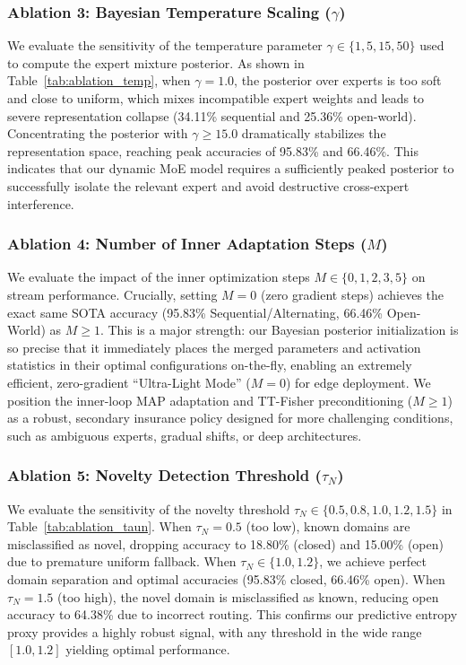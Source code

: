 \documentclass{article}
\theoremstyle{plain}
\theoremstyle{definition}
\theoremstyle{remark}
\begin{document}
\subsubsection{Ablation 3: Bayesian Temperature Scaling ($\gamma$)}\vspace{-0.1in}
We evaluate the sensitivity of the temperature parameter $\gamma \in \{1, 5, 15, 50\}$ used to
compute the expert mixture posterior.
As shown in Table~\ref{tab:ablation_temp}, when $\gamma=1.0$, the posterior over experts is too
soft and close to uniform, which mixes incompatible expert weights and leads to severe
representation collapse (34.11\% sequential and 25.36\% open-world). Concentrating the posterior
with $\gamma \ge 15.0$ dramatically stabilizes the representation space, reaching peak accuracies of
95.83\% and 66.46\%. This indicates that our dynamic MoE model requires a
sufficiently peaked posterior to successfully isolate the relevant expert and avoid destructive
cross-expert interference.

\subsubsection{Ablation 4: Number of Inner Adaptation Steps ($M$)}\vspace{-0.1in}
We evaluate the impact of the inner optimization steps $M \in \{0, 1, 2, 3, 5\}$ on stream
performance. Crucially, setting $M=0$ (zero gradient steps) achieves the exact same SOTA accuracy
(95.83\% Sequential/Alternating, 66.46\% Open-World) as $M \ge 1$. This is a major strength: our Bayesian posterior initialization is so precise that it immediately places the merged parameters and activation statistics in their optimal configurations on-the-fly, enabling an extremely efficient, zero-gradient ``Ultra-Light Mode'' ($M=0$) for edge deployment. We position the inner-loop MAP adaptation and TT-Fisher preconditioning ($M \ge 1$) as a robust, secondary insurance policy designed for more challenging conditions, such as ambiguous experts, gradual shifts, or deep architectures.

\subsubsection{Ablation 5: Novelty Detection Threshold ($\tau_N$)}\vspace{-0.1in}
We evaluate the sensitivity of the novelty threshold $\tau_N \in \{0.5, 0.8, 1.0, 1.2, 1.5\}$ in
Table~\ref{tab:ablation_taun}. When $\tau_N=0.5$ (too low), known domains are misclassified as
novel, dropping accuracy to 18.80\% (closed) and 15.00\% (open) due to premature uniform fallback. When $\tau_N \in \{1.0, 1.2\}$, we achieve perfect domain separation and optimal accuracies
(95.83\% closed, 66.46\% open). When $\tau_N=1.5$ (too high), the novel domain is misclassified as
known, reducing open accuracy to 64.38\% due to incorrect routing. This confirms our predictive entropy proxy provides a highly robust signal, with any threshold in the wide range $[1.0, 1.2]$ yielding optimal performance.
\end{document}
